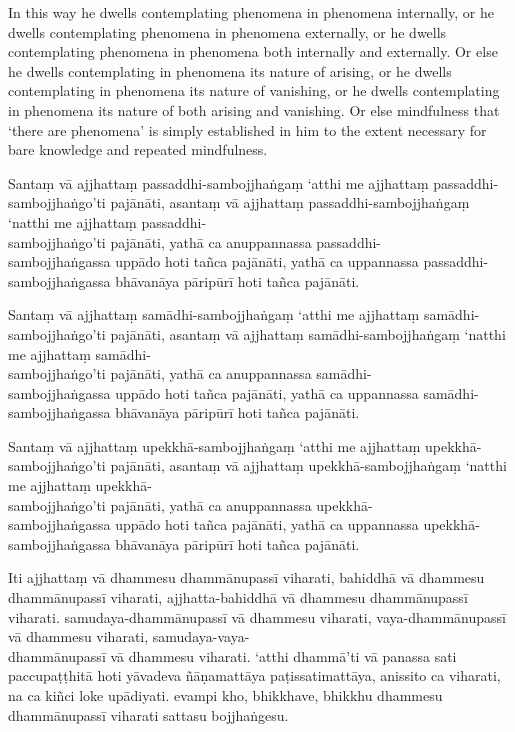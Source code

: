 In this way he dwells contemplating phenomena in phenomena internally, or he
dwells contemplating phenomena in phenomena externally, or he dwells
contemplating phenomena in phenomena both internally and externally. Or else he
dwells contemplating in phenomena its nature of arising, or he dwells
contemplating in phenomena its nature of vanishing, or he dwells contemplating
in phenomena its nature of both arising and vanishing. Or else mindfulness that
‘there are phenomena’ is simply established in him to the extent necessary for
bare knowledge and repeated mindfulness.

\paliPage

Santaṃ vā ajjhattaṃ passaddhi-sambojjhaṅgaṃ ‘atthi me ajjhattaṃ passaddhi-sambojjhaṅgo’ti pajānāti,
asantaṃ vā ajjhattaṃ passaddhi-sambojjhaṅgaṃ ‘natthi me ajjhattaṃ passaddhi-\\ sambojjhaṅgo’ti pajānāti,
yathā ca anuppannassa passaddhi-\\ sambojjhaṅgassa uppādo hoti tañca pajānāti,
yathā ca uppannassa passaddhi-sambojjhaṅgassa bhāvanāya pāripūrī hoti tañca pajānāti.

Santaṃ vā ajjhattaṃ samādhi-sambojjhaṅgaṃ ‘atthi me ajjhattaṃ samādhi-sambojjhaṅgo’ti pajānāti,
asantaṃ vā ajjhattaṃ samādhi-sambojjhaṅgaṃ ‘natthi me ajjhattaṃ samādhi-\\ sambojjhaṅgo’ti pajānāti,
yathā ca anuppannassa samādhi-\\ sambojjhaṅgassa uppādo hoti tañca pajānāti,
yathā ca uppannassa samādhi-sambojjhaṅgassa bhāvanāya pāripūrī hoti tañca pajānāti.

Santaṃ vā ajjhattaṃ upekkhā-sambojjhaṅgaṃ ‘atthi me ajjhattaṃ upekkhā-sambojjhaṅgo’ti pajānāti,
asantaṃ vā ajjhattaṃ upekkhā-sambojjhaṅgaṃ ‘natthi me ajjhattaṃ upekkhā-\\ sambojjhaṅgo’ti pajānāti,
yathā ca anuppannassa upekkhā-\\ sambojjhaṅgassa uppādo hoti tañca pajānāti,
yathā ca uppannassa upekkhā-sambojjhaṅgassa bhāvanāya pāripūrī hoti tañca pajānāti.

Iti ajjhattaṃ vā dhammesu dhammānupassī viharati,
bahiddhā vā dhammesu dhammānupassī viharati,
ajjhatta-bahiddhā vā dhammesu dhammānupassī viharati.
samudaya-dhammānupassī vā dhammesu viharati,
vaya-dhammānupassī vā dhammesu viharati,
samudaya-vaya-\\ dhammānupassī vā dhammesu viharati.
‘atthi dhammā’ti vā panassa sati paccupaṭṭhitā hoti
yāvadeva ñāṇamattāya paṭissatimattāya, anissito ca viharati,
na ca kiñci loke upādiyati. evampi kho, bhikkhave, bhikkhu
dhammesu dhammānupassī viharati sattasu bojjhaṅgesu.

